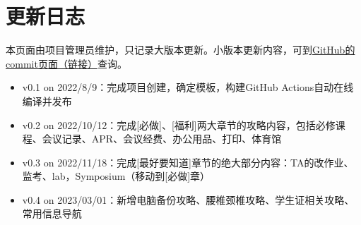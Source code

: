 \chapter{更新日志}

本页面由项目管理员维护，只记录大版本更新。小版本更新内容，可到\href{https://github.com/kaiwu-astro/xp_pgrs_unofficial_guide/commits/main}{GitHub的commit页面（链接）}查询。

\begin{itemize}
    \item v0.1 on 2022/8/9：完成项目创建，确定模板，构建GitHub Actions自动在线编译并发布
    \item v0.2 on 2022/10/12：完成[必做]、[福利]两大章节的攻略内容，包括必修课程、会议记录、APR、会议经费、办公用品、打印、体育馆
    \item v0.3 on 2022/11/18：完成[最好要知道]章节的绝大部分内容：TA的改作业、监考、lab，Symposium（移动到[必做]章）
    \item v0.4 on 2023/03/01：新增电脑备份攻略、腰椎颈椎攻略、学生证相关攻略、常用信息导航
\end{itemize}


